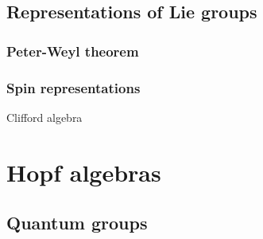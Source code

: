 \documentclass{../../large}
\begin{document}
\chapter{Representations of Lie groups}
\section{Peter-Weyl theorem}
\section{Spin representations}
Clifford algebra






\part{Hopf algebras}
\chapter{}
\chapter{Quantum groups}
\end{document}
